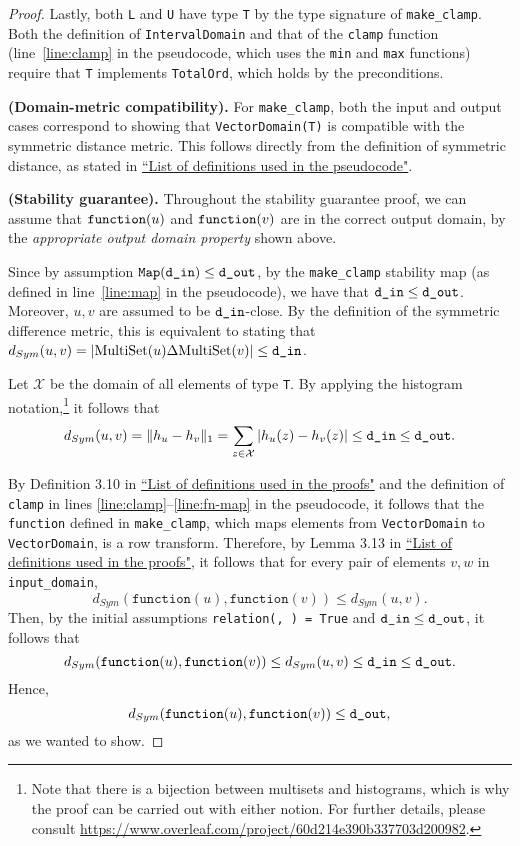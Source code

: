 \documentclass{article}
\begin{document}
\begin{proof}
Lastly, both \texttt{L} and \texttt{U} have type \texttt{T} by the type signature of \texttt{make\_clamp}. Both the definition of \texttt{IntervalDomain} and that of the \texttt{clamp} function (line~\ref{line:clamp} in the pseudocode, which uses the \texttt{min} and \texttt{max} functions) require that \texttt{T} implements \texttt{TotalOrd}, which holds by the preconditions.

\smallskip
\textbf{(Domain-metric compatibility).} For \texttt{make\_clamp}, both the input and output cases correspond to showing that \texttt{VectorDomain(T)} is compatible with the symmetric distance metric. This follows directly from the definition of symmetric distance, as stated in \href{https://www.overleaf.com/project/60d215bf90b337ac02200a99}{``List of definitions used in the pseudocode"}.

\smallskip
\textbf{(Stability guarantee).} Throughout the stability guarantee proof, we can assume that $\texttt{function}(u)$ and $\texttt{function}(v)$ are in the correct output domain, by the \textit{appropriate output domain property} shown above. 

Since by assumption $\texttt{Map}(\texttt{d\_in}) \leq \texttt{d\_out}$, by the \texttt{make\_clamp} stability map (as defined in line~\ref{line:map} in the pseudocode), we have that $\texttt{d\_in} \leq \texttt{d\_out}$. 
Moreover, $u, v$ are assumed to be $\texttt{d\_in}$-close. By the definition of the symmetric difference metric, this is equivalent to stating that $d_{Sym}(u, v) = |\mathrm{MultiSet}(u) \Delta \mathrm{MultiSet}(v)| \leq \texttt{d\_in}$.

Let $\mathcal{X}$ be the domain of all elements of type \texttt{T}. By applying the histogram notation,\footnote{Note that there is a bijection between multisets and histograms, which is why the proof can be carried out with either notion. For further details, please consult \url{https://www.overleaf.com/project/60d214e390b337703d200982}.}  it follows that
\[
d_{Sym}(u, v) = \lVert h_{u} - h_{v}\rVert_1 = \sum_{z \in \mathcal{X}} |h_u(z) - h_v(z)| \leq \texttt{d\_in} \leq \texttt{d\_out}.
\]

By Definition 3.10 in \href{https://www.overleaf.com/project/60d214e390b337703d200982}{``List of definitions used in the proofs"} and the definition of \texttt{clamp} in lines \ref{line:clamp}--\ref{line:fn-map} in the pseudocode, it follows that the \texttt{function} defined in \texttt{make\_clamp}, which maps elements from \texttt{VectorDomain} to \texttt{VectorDomain}, is a row transform. Therefore, by Lemma 3.13 in \href{https://www.overleaf.com/project/60d214e390b337703d200982}{``List of definitions used in the proofs"}, it follows that for every pair of elements $v, w$ in \texttt{input\_domain},
\[
    d_{Sym}(\texttt{function}(u), \texttt{function}(v)) \leq d_{Sym}(u, v).
\]
Then, by the initial assumptions \texttt{relation(\din, \dout) = True} and $\texttt{d\_in} \leq \texttt{d\_out}$, it follows that
\[
    d_{Sym}(\texttt{function}(u), \texttt{function}(v)) \leq d_{Sym}(u, v) \leq \texttt{d\_in} \leq \texttt{d\_out}.
\]
Hence,
\[
    d_{Sym}(\texttt{function}(u), \texttt{function}(v)) \leq \texttt{d\_out},
\]
as we wanted to show.
\end{proof}
\end{document}
